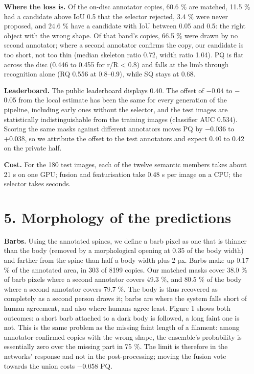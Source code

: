 \textbf{Where the loss is.} Of the on-disc annotator copies, 60.6 \% are matched, 11.5 \% had a candidate
above IoU 0.5 that the selector rejected, 3.4 \% were never proposed, and 24.6 \% have a candidate
with IoU between 0.05 and 0.5: the right object with the wrong shape. Of that band's copies, 66.5 \% were
drawn by no second annotator; where a second annotator confirms the copy, our candidate is too
short, not too thin (median skeleton ratio 0.72, width ratio 1.04). PQ is flat across the disc (0.446 to 0.455 for
r/R \textless{} 0.8) and falls at the limb through recognition alone (RQ 0.556 at 0.8--0.9), while SQ stays
at 0.68.

\textbf{Leaderboard.} The public leaderboard displays 0.40. The offset of $-$0.04 to $-$0.05 from the
local estimate has been the same for every generation of the pipeline, including early ones
without the selector, and the test images are statistically indistinguishable from the training
images (classifier AUC 0.534). Scoring the same masks against different annotators moves PQ by
$-$0.036 to +0.038, so we attribute the offset to the test annotators and expect 0.40 to 0.42 on the
private half.

\textbf{Cost.} For the 180 test images, each of the twelve semantic members takes about 21 s on one
GPU; fusion and featurisation take 0.48 s per image on a CPU; the selector takes seconds.

\section{5. Morphology of the predictions}\label{morphology-of-the-predictions}

\textbf{Barbs.} Using the annotated spines, we define a barb pixel as one that is thinner than the body
(removed by a morphological opening at 0.35 of the body width) and farther from the spine than
half a body width plus 2 px. Barbs make up 0.17 \% of the annotated area, in 303 of 8199 copies.
Our matched masks cover 38.0 \% of barb pixels where a second annotator covers 49.3 \%, and 80.5 \%
of the body where a second annotator covers 79.7 \%. The body is thus recovered as completely as a
second person draws it; barbs are where the system falls short of human agreement, and also where
humans agree least. Figure 1 shows both outcomes: a short barb attached to a dark body is
followed, a long faint one is not. This is the same problem as the missing faint length of a
filament: among annotator-confirmed copies with the wrong shape, the ensemble's probability is
essentially zero over the missing part in 75 \%. The limit is therefore in the networks' response
and not in the post-processing; moving the fusion vote towards the union costs $-$0.058 PQ.

